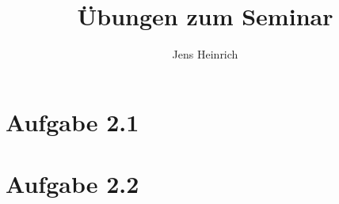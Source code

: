 \documentclass{article}
\title{\"Ubungen zum Seminar \boldfont{Kategorientheorie} }
\author{Jens Heinrich}
\begin{document}
 				 
			
\section*{Aufgabe 2.1}
	


\newpage	
\section*{Aufgabe 2.2}
	
	
\end{document}
